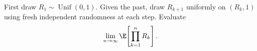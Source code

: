 First draw $R_1\sim\operatorname{Unif}(0,1)$. Given the past, draw $R_{k+1}$ uniformly on $(R_k,1)$ using fresh independent randomness at each step. Evaluate
\[
\lim_{n\to\infty}\E\!\left[\prod_{k=1}^nR_k\right].
\]
